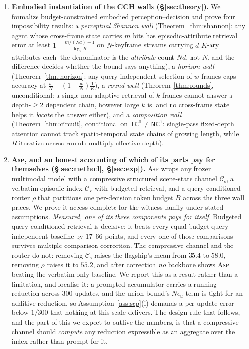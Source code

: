 \documentclass[10pt]{article}
\newcommand{\VN}{300}
\theoremstyle{definition}
\theoremstyle{plain}
\newcommand{\ASP}{\textsc{Asp}}
\newcommand{\cs}{\mathcal{C}_{\mathrm{s}}}
\newcommand{\cv}{\mathcal{C}_{\mathrm{v}}}
\begin{document}
\begin{enumerate}[leftmargin=1.6em,itemsep=1pt]
\item \textbf{Embodied instantiation of the CCH walls (\S\ref{sec:theory}).} We formalize budget-constrained embodied perception--decision and prove four impossibility results: a \emph{perceptual Shannon wall} (Theorem~\ref{thm:shannon}: any agent whose cross-frame state carries $m$ bits has episodic-attribute retrieval error at least $1-\frac{m/(Nd)+1}{\log_2 K}$ on $N$-keyframe streams carrying $d$ $K$-ary attributes each; the denominator is the \emph{attribute} count $Nd$, not $N$, and the difference decides whether the bound says anything), a \emph{horizon wall} (Theorem~\ref{thm:horizon}: any query-independent selection of $w$ frames caps accuracy at $\frac{w}{N}+(1-\frac{w}{N})\frac{1}{K}$), a \emph{round wall} (Theorem~\ref{thm:rounds}, unconditional: a single non-adaptive retrieval of $k$ frames cannot answer a depth-$\ge2$ dependent chain, however large $k$ is, and no cross-frame state helps it \emph{locate} the answer either), and a \emph{composition wall} (Theorem~\ref{thm:circuit}, conditional on $\mathsf{TC}^0\neq\mathsf{NC}^1$: single-pass fixed-depth attention cannot track spatio-temporal state chains of growing length, while $R$ iterative access rounds multiply effective depth).
\item \textbf{\ASP{}, and an honest accounting of which of its parts pay for themselves (\S\ref{sec:method}, \S\ref{sec:exp}).} \ASP{} wraps any frozen multimodal model with a compressive structured scene-state channel $\cs$, a verbatim episodic index $\cv$ with budgeted retrieval, and a query-conditioned router $\rho$ that partitions one per-decision token budget $B$ across the three wall prices. We prove it access-complete for the witness family under stated assumptions. \emph{Measured, one of its three components pays for itself.} Budgeted query-conditioned retrieval is decisive; it beats every equal-budget query-independent baseline by $17$--$66$ points, and every one of those comparisons survives multiple-comparison correction. The compressive channel and the router do not: removing $\cs$ raises the flagship's mean from $35.4$ to $58.0$, removing $\rho$ raises it to $55.2$, and after correction \emph{no} backbone shows \ASP{} beating the verbatim-only baseline. We report this as a result rather than a limitation, and localise it: a prompted accumulator carries a running reduction across $\VN{}$ updates, and the union bound's $N\epsilon_u$ term is tight for an additive reduction, so Assumption~\ref{ass:sep}(i) demands a per-update error below $1/\VN{}$ that nothing at this scale delivers. The design rule that follows, and the part of this we expect to outlive the numbers, is that a compressive channel should \emph{compute} any reduction expressible as an aggregate over the index rather than prompt for it.


\end{enumerate}
\end{document}
